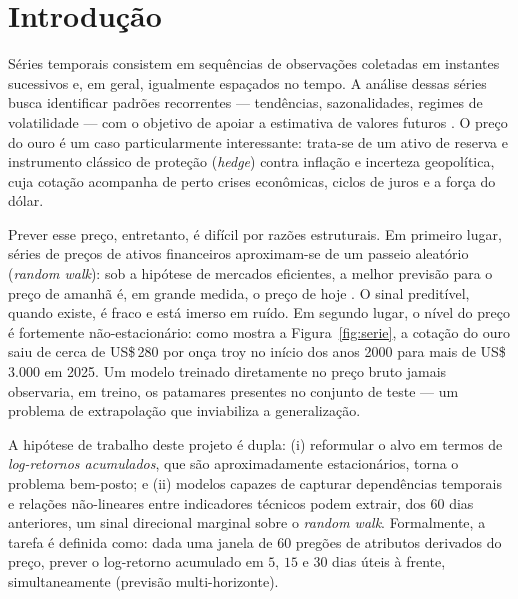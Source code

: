\documentclass[12pt]{article}
\begin{document}
\section{Introdução}
\label{sec:introducao}

Séries temporais consistem em sequências de observações coletadas em instantes
sucessivos e, em geral, igualmente espaçados no tempo. A análise dessas séries
busca identificar padrões recorrentes --- tendências, sazonalidades, regimes de
volatilidade --- com o objetivo de apoiar a estimativa de valores futuros
\cite{boxjenkins2015,hyndman2021fpp}. O preço do ouro é um caso particularmente
interessante: trata-se de um ativo de reserva e instrumento clássico de
proteção (\emph{hedge}) contra inflação e incerteza geopolítica, cuja cotação
acompanha de perto crises econômicas, ciclos de juros e a força do dólar.

Prever esse preço, entretanto, é difícil por razões estruturais. Em primeiro
lugar, séries de preços de ativos financeiros aproximam-se de um passeio
aleatório (\emph{random walk}): sob a hipótese de mercados eficientes, a melhor
previsão para o preço de amanhã é, em grande medida, o preço de hoje
\cite{fama1970efficient}. O sinal preditível, quando existe, é fraco e está
imerso em ruído. Em segundo lugar, o nível do preço é fortemente
não-estacionário: como mostra a Figura~\ref{fig:serie}, a cotação do ouro saiu
de cerca de US\$\,280 por onça troy no início dos anos 2000 para mais de
US\$\,3.000 em 2025. Um modelo treinado diretamente no preço bruto jamais
observaria, em treino, os patamares presentes no conjunto de teste --- um
problema de extrapolação que inviabiliza a generalização.

A hipótese de trabalho deste projeto é dupla: (i) reformular o alvo em termos
de \emph{log-retornos acumulados}, que são aproximadamente estacionários, torna
o problema bem-posto; e (ii) modelos capazes de capturar dependências
temporais e relações não-lineares entre indicadores técnicos podem extrair, dos
$60$ dias anteriores, um sinal direcional marginal sobre o \emph{random walk}.
Formalmente, a tarefa é definida como: dada uma janela de $60$ pregões de
atributos derivados do preço, prever o log-retorno acumulado em $5$, $15$ e $30$
dias úteis à frente, simultaneamente (previsão multi-horizonte).
\end{document}
